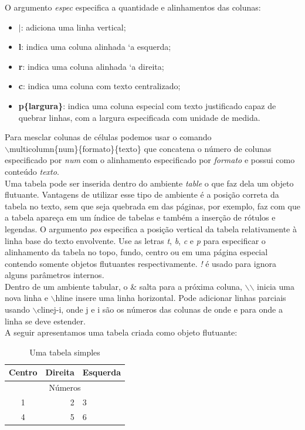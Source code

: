 \documentclass[12pt]{article}
\begin{document}
					O argumento \textit{espec} especifica a quantidade e alinhamentos das colunas:
					\begin{itemize}
						\item \textbf{$|$}: adiciona uma linha vertical;
						\item \textbf{l}: indica uma coluna alinhada `a esquerda;
						\item \textbf{r}: indica uma coluna alinhada `a direita;
						\item \textbf{c}: indica uma coluna com texto centralizado;
						\item \textbf{p\{{largura}\}}: indica uma coluna especial com texto justificado capaz de quebrar linhas, com a largura especificada com unidade de medida.
					\end{itemize}
					Para mesclar colunas de células podemos usar o comando\\
					$\backslash$multicolumn\{{num}\}\{{formato}\}{\{texto}\}
					que concatena o número de colunas especificado por \textit{num} com o alinhamento especificado por \textit{formato} e possui como conteúdo \textit{texto}.\\ 
					Uma tabela pode ser inserida dentro do ambiente \textit{table} o que faz dela um objeto flutuante. Vantagens de utilizar esse tipo de ambiente é a posição correta da tabela no texto, sem que seja quebrada em das páginas, por exemplo, faz com que a tabela apareça em um índice de tabelas e também a inserção de rótulos e legendas.
					O argumento \textit{pos} especifica a posição vertical da tabela relativamente à linha base do texto envolvente. Use as letras \textit{t}, \textit{b}, \textit{c} e \textit{p} para especificar o alinhamento da tabela no topo, fundo, centro ou em uma página especial contendo somente objetos flutuantes respectivamente. \textit{!} é usado para  ignora alguns parâmetros internos.\\
					Dentro de um ambiente tabular, o \& salta para a próxima coluna, $\backslash$$\backslash$
					inicia uma nova linha e $\backslash$hline insere uma linha horizontal. Pode adicionar
					linhas parciais usando $\backslash$cline{j-i}, onde j e i são os números das colunas
					de onde e para onde a linha se deve estender.
					\\
					A seguir apresentamos uma tabela criada como objeto flutuante:
					\begin{table}[ht]
						\begin{center}
							\begin{tabular}{|c|r|l|}
								\hline
								Centro & Direita & Esquerda \\
								\hline
								\hline
								\multicolumn{3}{|c|}{Números}\\
								\hline
								1 & 2 & 3 \\ \cline{2-3}
								4 & 5 & 6 \\
								\hline
							\end{tabular}
							\caption{Uma tabela simples}
						\end{center}
					\end{table}
		
\end{document}
